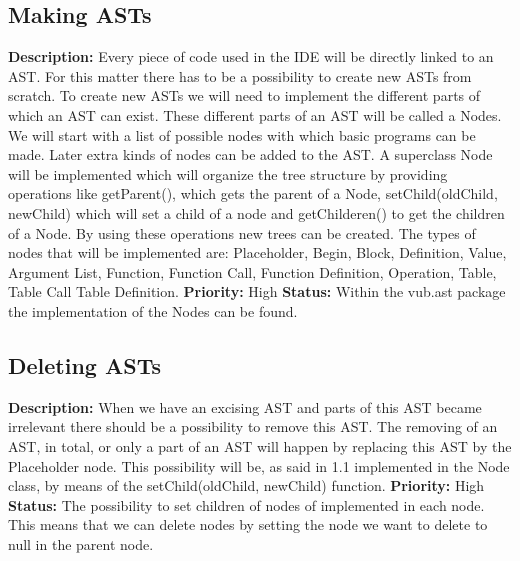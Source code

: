 \documentclass[a4paper,12pt]{report}
\begin{document}
\subsection{Making ASTs}
\textbf{Description: } Every piece of code used in the IDE will be directly linked to an AST. For this matter there has to be a possibility to create new ASTs from scratch.
To create new ASTs we will need to implement the different parts of which an AST can exist. These different parts of an AST will be called a Nodes. We will start with
a list of possible nodes with which basic programs can be made. Later extra kinds of nodes can be added to the AST.
A superclass Node will be implemented which will organize the tree structure by providing operations like getParent(), which gets the parent of a Node, setChild(oldChild, newChild)
which will set a child of a node and getChilderen() to get the children of a Node. By using these operations new trees can be created. 
The types of nodes that will be implemented are: Placeholder, Begin, Block, Definition, Value, Argument List, Function, Function Call, Function Definition, Operation, Table, Table Call
Table Definition.
 \newline
\textbf{Priority:} High \newline
\textbf{Status: }  Within the vub.ast package the implementation of the Nodes can be found.   \newline
\subsection{Deleting ASTs}
\textbf{Description: }When we have an excising AST and parts of this AST became irrelevant there should be a possibility to remove this AST. The removing of an AST, in total,
or only a part of an AST will happen by replacing this AST by the Placeholder node. This possibility will be, as said in 1.1 implemented in the Node class, by means of the 
setChild(oldChild, newChild) function. \newline
\textbf{Priority:} High \newline
\textbf{Status: } The possibility to set children of nodes of implemented in each node. This means that we can delete nodes by setting the 
node we want to delete to null in the parent node.\newline
\end{document}
